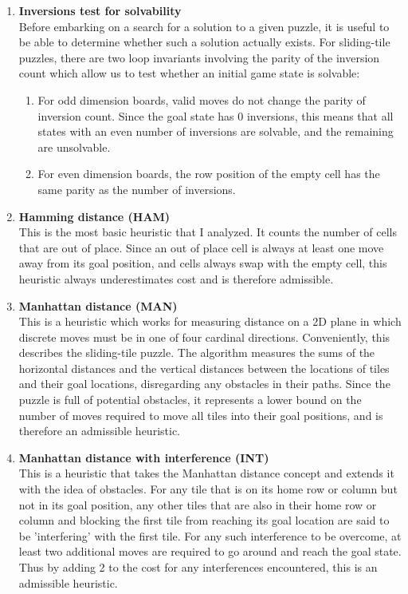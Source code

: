 \documentclass{article}
\newcommand\bitem[1]{\item{\bfseries #1}\\}
\begin{document}
	\begin{enumerate}
		\bitem{Inversions test for solvability}
		    Before embarking on a search for a solution to a given puzzle, it is useful to be able to determine whether such a solution actually exists.  For sliding-tile puzzles, there are two loop invariants involving the parity of the inversion count which allow us to test whether an initial game state is solvable:
		    \begin{enumerate}
		    	\item For odd dimension boards, valid moves do not change the parity of inversion count.  Since the goal state has 0 inversions, this means that all states with an even number of inversions are solvable, and the remaining are unsolvable.
		    	\item For even dimension boards, the row position of the empty cell has the same parity as the number of inversions.     
		    \end{enumerate}
		\bitem{Hamming distance (HAM)}
		    This is the most basic heuristic that I analyzed.  It counts the number of cells that are out of place.  Since an out of place cell is always at least one move away from its goal position, and cells always swap with the empty cell, this heuristic always underestimates cost and is therefore admissible.  
		\bitem{Manhattan distance (MAN)} 
		    This is a heuristic which works for measuring distance on a 2D plane in which discrete moves must be in one of four cardinal directions.  Conveniently, this describes the sliding-tile puzzle.  The algorithm measures the sums of the horizontal distances and the vertical distances between the locations of tiles and their goal locations, disregarding any obstacles in their paths.  Since the puzzle is full of potential obstacles, it represents a lower bound on the number of moves required to move all tiles into their goal positions, and is therefore an admissible heuristic.
		\bitem{Manhattan distance with interference (INT)}
		    This is a heuristic that takes the Manhattan distance concept and extends it with the idea of obstacles.  For any tile that is on its home row or column but not in its goal position, any other tiles that are also in their home row or column and blocking the first tile from reaching its goal location are said to be 'interfering' with the first tile.  For any such interference to be overcome, at least two additional moves are required to go around and reach the goal state.  Thus by adding 2 to the cost for any interferences encountered, this is an admissible heuristic. 
	\end{enumerate}
\end{document}
